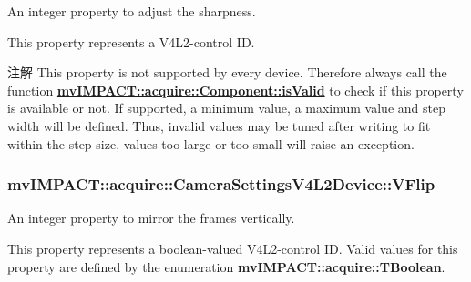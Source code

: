 An integer property to adjust the sharpness. 

This property represents a V4\+L2-\/control I\+D.

\begin{DoxyNote}{注解}
This property is not supported by every device. Therefore always call the function {\bfseries \hyperlink{classmv_i_m_p_a_c_t_1_1acquire_1_1_component_ac51e55e7e046101f3c6119d84123abd5}{mv\+I\+M\+P\+A\+C\+T\+::acquire\+::\+Component\+::is\+Valid}} to check if this property is available or not. If supported, a minimum value, a maximum value and step width will be defined. Thus, invalid values may be tuned after writing to fit within the step size, values too large or too small will raise an exception. 
\end{DoxyNote}
\hypertarget{classmv_i_m_p_a_c_t_1_1acquire_1_1_camera_settings_v4_l2_device_ac01abfd8789e38a90823409c4908fdc0}{
\subsubsection[{V\+Flip}]{ mv\+I\+M\+P\+A\+C\+T\+::acquire\+::\+Camera\+Settings\+V4\+L2\+Device\+::\+V\+Flip}}\label{classmv_i_m_p_a_c_t_1_1acquire_1_1_camera_settings_v4_l2_device_ac01abfd8789e38a90823409c4908fdc0}


An integer property to mirror the frames vertically. 

This property represents a boolean-\/valued V4\+L2-\/control I\+D. Valid values for this property are defined by the enumeration {\bfseries mv\+I\+M\+P\+A\+C\+T\+::acquire\+::\+T\+Boolean}.

